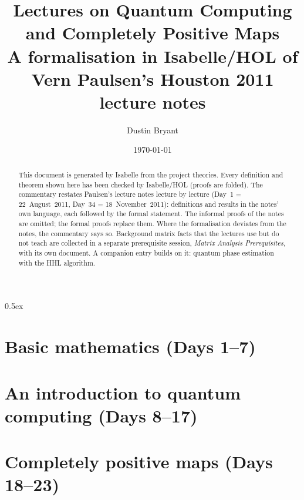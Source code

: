 \documentclass[11pt,a4paper]{article}
\theoremstyle{definition}
\begin{document}
\title{Lectures on Quantum Computing and Completely Positive Maps\\[0.5em]
  \large A formalisation in Isabelle/HOL of Vern Paulsen's Houston 2011 lecture notes}
\author{Dustin Bryant}
\date{\today}
\maketitle

\begin{abstract}
This document is generated by Isabelle from the project theories.  Every
definition and theorem shown here has been checked by Isabelle/HOL (proofs are
folded).  The commentary restates Paulsen's lecture notes lecture by lecture
(Day~1 = 22~August~2011, Day~34 = 18~November~2011): definitions and results in
the notes' own language, each followed by the formal statement.  The informal
proofs of the notes are omitted; the formal proofs replace them.  Where the
formalisation deviates from the notes, the commentary says so.  Background matrix facts that the lectures use but do not teach are collected in
a separate prerequisite session, \emph{Matrix Analysis Prerequisites}, with its own document.  A companion entry builds on it: quantum phase estimation with the HHL algorithm.
\end{abstract}

\tableofcontents
\newpage

\parindent 0pt\parskip 0.5ex


\part{Basic mathematics (Days 1--7)}








\part{An introduction to quantum computing (Days 8--17)}












\part{Completely positive maps (Days 18--23)}









\end{document}
